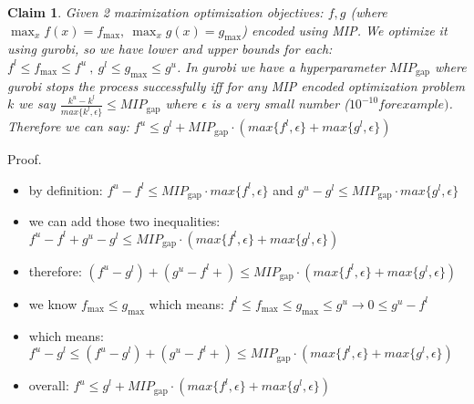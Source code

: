 \documentclass[11pt]{article}
\newtheorem{claim}{Claim}
\begin{document}
 
  \begin{claim}\label{claim:BoundriesForVhagar}
Given 2 maximization optimization objectives: $f,g$ (where $\max_x {f(x)}=f_\text{max},\ \max_x {g(x)}=g_\text{max}$) encoded using MIP. We optimize it using gurobi, so we have lower and upper bounds for each: $f^l \leq f_\text{max} \leq f^u\ ,\ g^l \leq g_\text{max} \leq g^u$. In gurobi we have a hyperparameter $MIP_\text{gap}$ where gurobi stops the process successfully iff for any MIP encoded optimization problem $k$ we say $\frac{k^u-k^l}{max\{k^l,\epsilon\}}\leq MIP_\text{gap}$ where $\epsilon$ is a very small number ($10^{-10} for example)$. Therefore we can say: $f^u\leq g^l+ MIP_\text{gap}\cdot (max\{f^l,\epsilon\}+max\{g^l,\epsilon\})$
 \end{claim}
 Proof. \begin{itemize}
   \item  by definition: $f^u-f^l \leq MIP_\text{gap}\cdot {max\{f^l,\epsilon\}}$ and $g^u-g^l \leq MIP_\text{gap}\cdot {max\{g^l,\epsilon\}}$
   \item we can add those two inequalities: $f^u-f^l+g^u-g^l \leq  MIP_\text{gap}\cdot (max\{f^l,\epsilon\}+max\{g^l,\epsilon\})$
   \item therefore: $(f^u-g^l)+(g^u-f^l+) \leq  MIP_\text{gap}\cdot (max\{f^l,\epsilon\}+max\{g^l,\epsilon\})$
   \item we know $f_\text{max} \leq g_\text{max}$ which means: $f^l \leq f_\text{max} \leq g_\text{max} \leq g^u \rightarrow 0 \leq g^u- f^l$
   \item which means: $f^u-g^l \leq (f^u-g^l)+(g^u-f^l+) \leq  MIP_\text{gap}\cdot (max\{f^l,\epsilon\}+max\{g^l,\epsilon\})$
   \item overall: $f^u\leq g^l+ MIP_\text{gap}\cdot (max\{f^l,\epsilon\}+max\{g^l,\epsilon\})$

 \end{itemize}
 
 
 
\end{document}
